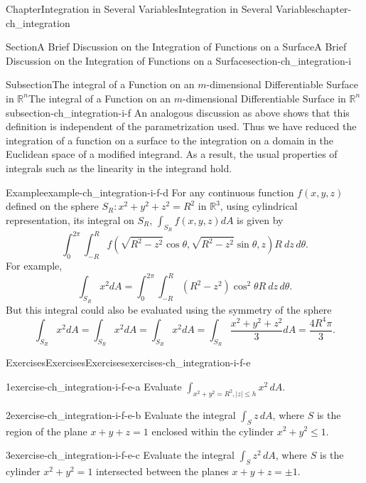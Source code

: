 \documentclass[oneside,10pt,]{book}
\numberwithin{equation}{section}
\newcommand{\bbR}{\mathbb{R}}
\begin{document}
\begin{chapterptx}{Chapter}{Integration in Several Variables}{}{Integration in Several Variables}{}{}{chapter-ch_integration}
\begin{sectionptx}{Section}{A Brief Discussion on the Integration of Functions on a Surface}{}{A Brief Discussion on the Integration of Functions on a Surface}{}{}{section-ch_integration-i}
\begin{subsectionptx}{Subsection}{The integral of a Function on an \(m\)-dimensional Differentiable Surface in \(\bbR^{n}\)}{}{The integral of a Function on an \(m\)-dimensional Differentiable Surface in \(\bbR^{n}\)}{}{}{subsection-ch_integration-i-f}
An analogous discussion as above shows that this definition is independent of the parametrization used. Thus we have reduced the integration of a function on a surface to the integration on a domain in the Euclidean space of a modified integrand. As a result, the usual properties of integrals such as the linearity in the integrand hold.%
\begin{example}{Example}{}{example-ch_integration-i-f-d}%
For any continuous function \(f(x, y, z)\) defined on the sphere \(S_{R}: x^{2}+y^{2}+z^{2}=R^{2}\) in \(\bbR^{3}\), using cylindrical representation, its integral on \(S_{R}\), \(\int_{S_{R}} f(x, y, z) dA\) is given by%
\begin{equation*}
\int_{0}^{2\pi}\int_{-R}^{R} f(\sqrt{R^{2}-z^{2}} \cos\theta, \sqrt{R^{2}-z^{2}} \sin\theta, z) R \ dz\, d\theta\text{.}
\end{equation*}
For example,%
\begin{equation*}
\int_{S_{R}} x^{2} dA =\int_{0}^{2\pi}\int_{-R}^{R} (R^{2}-z^{2}) \cos^{2}\theta R \ dz\, d\theta.
\end{equation*}
But this integral could also be evaluated using the symmetry of the sphere%
\begin{equation*}
\int_{S_{R}} x^{2} dA=\int_{S_{R}} x^{2} dA=\int_{S_{R}} x^{2} dA=\int_{S_{R}} \frac{x^{2}+y^{2}+z^{2}}{3} dA
=\frac{4R^{4}\pi}{3}.
\end{equation*}
\end{example}
%
%
\typeout{************************************************}
\typeout{************************************************}
%
\begin{exercises-subsubsection-numberless}{Exercises}{Exercises}{}{Exercises}{}{}{exercises-ch_integration-i-f-e}
\begin{divisionexercise}{1}{}{}{exercise-ch_integration-i-f-e-a}%
Evaluate \(\int_{x^{2}+y^{2}=R^{2}, |z|\le h} x^{2}\, dA\).%
\end{divisionexercise}%
\begin{divisionexercise}{2}{}{}{exercise-ch_integration-i-f-e-b}%
Evaluate the integral \(\int_{S}  z \, dA\), where \(S\) is the region of the plane \(x+y+z=1\) enclosed within the cylinder \(x^2+y^2 \le 1\).%
\end{divisionexercise}%
\begin{divisionexercise}{3}{}{}{exercise-ch_integration-i-f-e-c}%
Evaluate the integral \(\int_{S}  z^{2} \, dA\), where \(S\) is the cylinder \(x^{2} +y^{2}=1\) intersected between the planes \(x+y+z=\pm 1\).%

\end{divisionexercise}
\end{exercises-subsubsection-numberless}
\end{subsectionptx}
\end{sectionptx}
\end{chapterptx}
\end{document}

